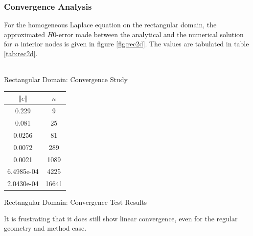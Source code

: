 \documentclass[a4paper,12pt]{article}
\makeatletter
\newenvironment{tablehere}
  {\def\@captype{table}}
  {}
\newenvironment{figurehere}
  {\def\@captype{figure}}
  {}
\makeatother
\begin{document}
\subsubsection{Convergence Analysis}
For the homogeneous Laplace equation on the rectangular domain, the approximated $H0$-error made between the analytical and the numerical solution for $n$ interior nodes is given in figure \ref{fig:rec2d}. The values are tabulated in table \ref{tab:rec2d}.
\begin{center}
\begin{figurehere}
\\
\caption{Rectangular Domain: Convergence Study}\label{fig:rec2d}
\end{figurehere}
\end{center}
\begin{center}
\begin{tablehere}
\begin{tabular}{cc}
 $\Vert e \Vert$ & $n$ \\
\hline
\hline
0.229 & 9\\
0.081 & 25\\
0.0256 & 81\\
0.0072 & 289\\
0.0021 & 1089\\
6.4985e-04 & 4225\\
2.0430e-04 & 16641
\end{tabular}
\caption{Rectangular Domain: Convergence Test Results}\label{tab:rec2d}
\end{tablehere}
\end{center}
It is frustrating that it does still show linear convergence, even for the regular geometry and method case.
\end{document}
